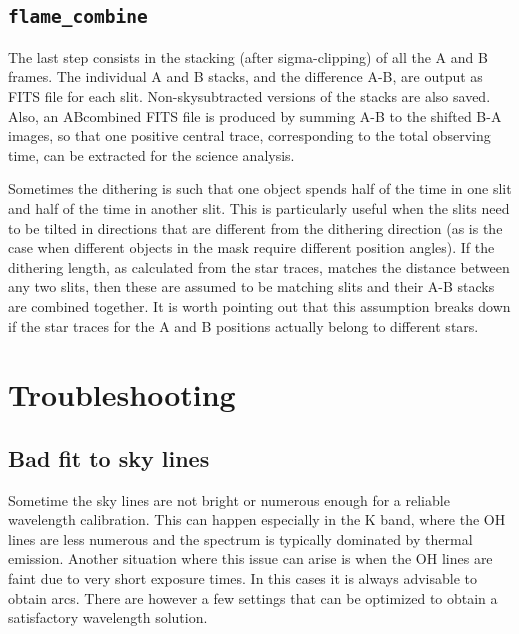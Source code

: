 \documentclass[a4paper, notitlepage]{article}
\begin{document}
\subsection{\texttt{flame\_combine}}

The last step consists in the stacking (after sigma-clipping) of all the A and B frames. The individual A and B stacks, and the difference A-B, are output as FITS file for each slit. Non-skysubtracted versions of the stacks are also saved. Also, an ABcombined FITS file is produced by summing A-B to the shifted B-A images, so that one positive central trace, corresponding to the total observing time, can be extracted for the science analysis.

Sometimes the dithering is such that one object spends half of the time in one slit and half of the time in another slit. This is particularly useful when the slits need to be tilted in directions that are different from the dithering direction (as is the case when different objects in the mask require different position angles). If the dithering length, as calculated from the star traces, matches the distance between any two slits, then these are assumed to be matching slits and their A-B stacks are combined together. It is worth pointing out that this assumption breaks down if the star traces for the A and B positions actually belong to different stars.





\section{Troubleshooting}
\label{sec:troubleshooting}


\subsection{Bad fit to sky lines}

Sometime the sky lines are not bright or numerous enough for a reliable wavelength calibration. This can happen especially in the K band, where the OH lines are less numerous and the spectrum is typically dominated by thermal emission. Another situation where this issue can arise is when the OH lines are faint due to very short exposure times. In this cases it is always advisable to obtain arcs. There are however a few settings that can be optimized to obtain a satisfactory wavelength solution.
\end{document}
